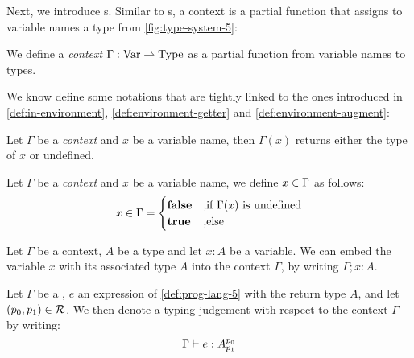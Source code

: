 Next, we introduce s. Similar to s, a context is a partial function that assigns to variable names a type from \cref{fig:type-system-5}:

\begin{definition}[Context]\label{def:context}
   We define a \emph{context} \(\Gamma : \text{Var} \rightharpoonup \text{Type}\) as a partial function from variable names to types.
\end{definition}

We know define some notations that are tightly linked to the ones introduced in \cref{def:in-environment}, \cref{def:environment-getter} and \cref{def:environment-augment}:


\begin{definition}\label{def:context-getter}
   Let \(\Gamma\) be a \emph{context} and \(x\) be a variable name, then \(\Gamma(x)\) returns either the type of \(x\) or undefined.
\end{definition}

\begin{definition}\label{def:in-context}
   Let \(\Gamma\) be a \emph{context} and \(x\) be a variable name, we define \(x \in \Gamma\) as follows:
   \[
      x \in \Gamma =
      \begin{cases}
	 \mathbf{false}	     & \text{,if } \Gamma(x) \text{ is undefined}\\
	 \mathbf{true}	     & \text{,else}
      \end{cases}
   \]
\end{definition}

\begin{definition}\label{def:context-augment}
   Let \(\Gamma\) be a context, \(A\) be a type and let \(x : A\) be a variable. We can embed the variable \(x\) with its associated type \(A\) into the context \(\Gamma\),  by writing \(\Gamma ; x:A\).
\end{definition}

\begin{definition}\label{def:type-judgement-context}
   Let \(\Gamma\) be a , \(e\) an expression of \cref{def:prog-lang-5} with the return type \(A\), and let \((p_0, p_1) \in \mathcal{R}\). We then denote a typing judgement with respect to the context \(\Gamma\) by writing:
   \[
      \Gamma \vdash e : A ^{p_0}_{p_1}
   \]
\end{definition}

